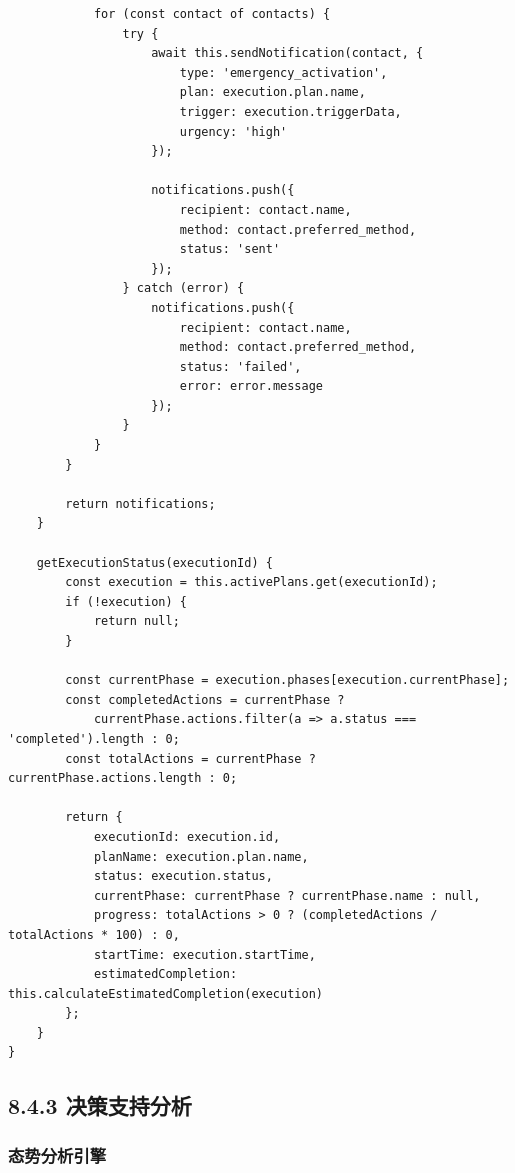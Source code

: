 \begin{lstlisting}
            for (const contact of contacts) {
                try {
                    await this.sendNotification(contact, {
                        type: 'emergency_activation',
                        plan: execution.plan.name,
                        trigger: execution.triggerData,
                        urgency: 'high'
                    });
                    
                    notifications.push({
                        recipient: contact.name,
                        method: contact.preferred_method,
                        status: 'sent'
                    });
                } catch (error) {
                    notifications.push({
                        recipient: contact.name,
                        method: contact.preferred_method,
                        status: 'failed',
                        error: error.message
                    });
                }
            }
        }
        
        return notifications;
    }
    
    getExecutionStatus(executionId) {
        const execution = this.activePlans.get(executionId);
        if (!execution) {
            return null;
        }
        
        const currentPhase = execution.phases[execution.currentPhase];
        const completedActions = currentPhase ? 
            currentPhase.actions.filter(a => a.status === 'completed').length : 0;
        const totalActions = currentPhase ? currentPhase.actions.length : 0;
        
        return {
            executionId: execution.id,
            planName: execution.plan.name,
            status: execution.status,
            currentPhase: currentPhase ? currentPhase.name : null,
            progress: totalActions > 0 ? (completedActions / totalActions * 100) : 0,
            startTime: execution.startTime,
            estimatedCompletion: this.calculateEstimatedCompletion(execution)
        };
    }
}
\end{lstlisting}

\subsection{8.4.3
决策支持分析}\label{ux51b3ux7b56ux652fux6301ux5206ux6790}

\subsubsection{态势分析引擎}\label{ux6001ux52bfux5206ux6790ux5f15ux64ce}


